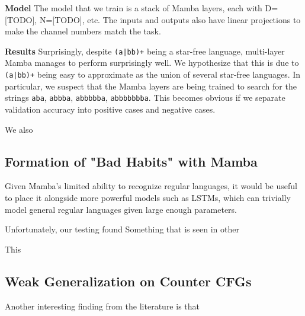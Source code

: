 \textbf{Model} The model that we train is a stack of Mamba layers, each with 
D=[TODO], N=[TODO], etc.
The inputs and outputs also have linear projections to make the channel numbers
match the task.

\textbf{Results} Surprisingly, despite \texttt{(a|bb)+} being a star-free
language, multi-layer Mamba manages to perform surprisingly well.
We hypothesize that this is due to \texttt{(a|bb)+} being easy to approximate
as the union of several star-free languages.
% 
In particular, we suspect that the Mamba layers are being trained to search for
the strings \texttt{aba}, \texttt{abbba}, \texttt{abbbbba}, \texttt{abbbbbbba}.
This becomes obvious if we separate validation accuracy into positive cases and
negative cases.

We also 



\subsection{Formation of "Bad Habits" with Mamba}
Given Mamba's limited ability to recognize regular languages, it would be useful
to place it alongside more powerful models such as LSTMs, which can trivially
model general regular languages given large enough parameters.

Unfortunately, our testing found
Something that is seen in other 


This 

\subsection{Weak Generalization on Counter CFGs}
Another interesting finding from the literature is that 
